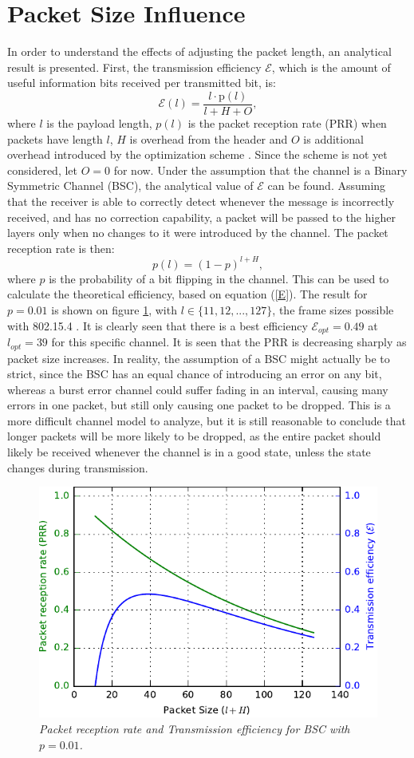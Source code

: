 \section{Packet Size Influence}\label{sec:pacSizeInf}
In order to understand the effects of adjusting the packet length, an analytical result is presented. First, the transmission efficiency $\mathcal{E}$, which is the amount of useful information bits received per transmitted bit, is:
\begin{equation}
\mathcal{E}(l) = \frac{l\cdot \text{p}(l)}{l + H + O},\label{E}
\end{equation}
where $l$ is the payload length, $p(l)$ is the packet reception rate (PRR) when packets have length $l$, $H$ is overhead from the header and $O$ is additional overhead introduced by the optimization scheme \cite{DPLCpaper}. Since the scheme is not yet considered, let $O=0$ for now. Under the assumption that the channel is a Binary Symmetric Channel (BSC), the analytical value of $\mathcal{E}$ can be found. Assuming that the receiver is able to correctly detect whenever the message is incorrectly received, and has no correction capability, a packet will be passed to the higher layers only when no changes to it were introduced by the channel. The packet reception rate is then:
\begin{equation}
p(l) = (1 - p)^{l+H},
\end{equation}
where $p$ is the probability of a bit flipping in the channel. This can be used to calculate the theoretical efficiency, based on equation (\ref{E}). The result for $p=0.01$ is shown on figure \ref{fig:BSC}, with $l\in \{11,12,...,127\}$, the frame sizes possible with 802.15.4 \cite{CC2420}. It is clearly seen that there is a best efficiency $\mathcal{E}_{opt} = 0.49$ at $l_{opt} = 39$ for this specific channel. It is seen that the PRR is decreasing sharply as packet size increases. In reality, the assumption of a BSC might actually be to strict, since the BSC has an equal chance of introducing an error on any bit, whereas a burst error channel could suffer fading in an interval, causing many errors in one packet, but still only causing one packet to be dropped. This is a more difficult channel model to analyze, but it is still reasonable to conclude that longer packets will be more likely to be dropped, as the entire packet should likely be received whenever the channel is in a good state, unless the state changes during transmission.
\begin{figure}
\centering
\includegraphics[scale=1]{figs/simFig_BSC001.pdf} 
\caption{\textit{Packet reception rate and Transmission efficiency for BSC with $p=0.01$.}\label{fig:BSC}}
\end{figure}